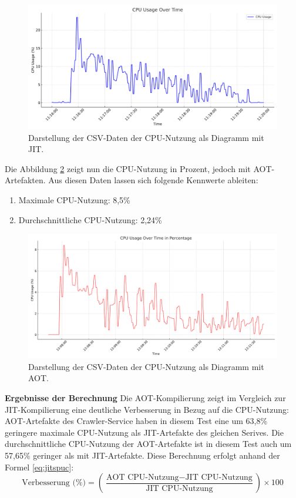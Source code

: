 \begin{figure}[H]
    \centering
    \includegraphics[width=12cm]{images/80_eval/CPU_Usage_Over_Time.pdf}
    \caption[]{Darstellung der CSV-Daten der CPU-Nutzung als Diagramm mit \acl{JIT}.}
    \label{fig:cpujit}
\end{figure}
Die Abbildung \ref{fig:cpuaot} zeigt nun die CPU-Nutzung in Prozent, jedoch mit \ac{AOT}-Artefakten. Aus diesen Daten lassen sich folgende Kennwerte ableiten:
\begin{enumerate}
    \item Maximale CPU-Nutzung: 8,5\%
    \item Durchschnittliche CPU-Nutzung: 2,24\%
\end{enumerate}
\begin{figure}[H]
    \centering
    \includegraphics[width=12cm]{images/80_eval/cpu_usage_percentage_simplified_over_time.pdf}
    \caption[]{Darstellung der CSV-Daten der CPU-Nutzung als Diagramm mit \acl{AOT}.}
    \label{fig:cpuaot}
\end{figure}
\textbf{Ergebnisse der Berechnung} \newline
Die \ac{AOT}-Kompilierung zeigt im Vergleich zur \ac{JIT}-Kompilierung eine deutliche Verbesserung in Bezug auf die CPU-Nutzung: \ac{AOT}-Artefakte des Crawler-Service haben in diesem Test eine um 63,8\% geringere maximale CPU-Nutzung als \ac{JIT}-Artefakte des gleichen Serives. Die durchschnittliche CPU-Nutzung der \ac{AOT}-Artefakte ist in diesem Test auch um 57,65\% geringer als mit \ac{JIT}-Artefakte. Diese Berechnung erfolgt anhand der Formel \ref{eq:jitspuc}:
\begin{equation}
\text{Verbesserung (\%)} = \left( \frac{\text{AOT CPU-Nutzung} - \text{JIT CPU-Nutzung}}{\text{JIT CPU-Nutzung}} \right) \times 100    
\label{eq:jitspuc}
\end{equation}


